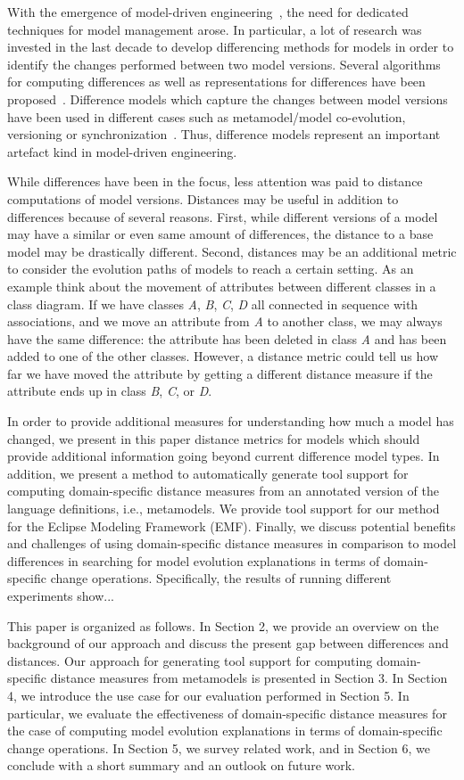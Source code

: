 With the emergence of model-driven engineering~\cite{}, the need for dedicated techniques for model management arose. In particular, a lot of research was invested in the last decade to develop differencing methods for models in order to identify the changes performed between two model versions. Several algorithms for computing differences as well as representations for differences have been proposed~\cite{}. Difference models which capture the changes between model versions have been used in different cases such as metamodel/model co-evolution, versioning or synchronization~\cite{}.
Thus, difference models represent an important artefact kind in model-driven engineering.

While differences have been in the focus, less attention was paid to distance computations of model versions. Distances may be useful in addition to differences because of several reasons. First, while different versions of a model may have a similar or even same amount of differences, the distance to a base model may be drastically different. Second, distances may be an additional metric to consider the evolution paths of models to reach a certain setting. As an example think about the movement of attributes between different classes in a class diagram. If we have classes \emph{A}, \emph{B}, \emph{C}, \emph{D} all connected in sequence with associations, and we move an attribute from \emph{A} to another class, we may always have the same difference: the attribute has been deleted in class \emph{A} and has been added to one of the other classes. However, a distance metric could tell us how far we have moved the attribute by getting a different distance measure if the attribute ends up in class \emph{B}, \emph{C}, or \emph{D}.

In order to provide additional measures for understanding how much a model has changed, we present in this paper distance metrics for models which should provide additional information going beyond current difference model types. In addition, we present a method to automatically generate tool support for computing domain-specific distance measures from an annotated version of the language definitions, i.e., metamodels. We provide tool support for our method for the Eclipse Modeling Framework (EMF). Finally, we discuss potential benefits and challenges of using domain-specific distance measures in comparison to model differences in searching for model evolution explanations in terms of domain-specific change operations. Specifically, the results of running different experiments show...

This paper is organized as follows. In Section 2, we provide an overview on the background of our approach and discuss the present gap between differences and distances. Our approach for generating tool support for computing domain-specific distance measures from metamodels is presented in Section 3. In Section 4, we introduce the use case for our evaluation performed in Section 5. In particular, we evaluate the effectiveness of domain-specific distance measures for the case of computing model evolution explanations in terms of domain-specific change operations. In Section 5, we survey related work, and in Section 6, we conclude with a short summary and an outlook on future work. 